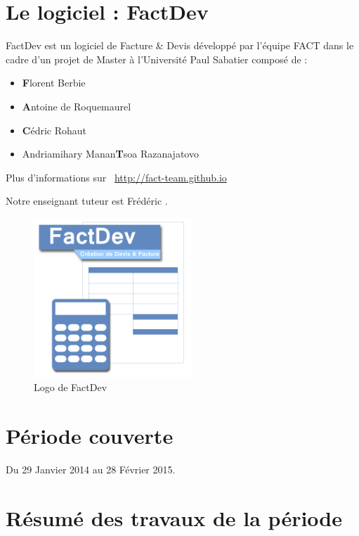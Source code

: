 \documentclass[12pt,a4paper,openany]{article}
\begin{document}
	\thispagestyle{empty} %
	\titleBC 
	\newpage
	\setcounter{tocdepth}{1}
	\setcounter{secnumdepth}{3}
	
	\tableofcontents
	\newpage
	\section{Le logiciel : FactDev}
	FactDev est un logiciel de Facture \& Devis développé par l'équipe FACT dans le cadre d'un projet de Master à l'Université Paul Sabatier composé de : 
	\begin{itemize}
		\item \textbf{F}lorent Berbie
		\item \textbf{A}ntoine de Roquemaurel
		\item \textbf{C}édric Rohaut
		\item Andriamihary Manan\textbf{T}soa Razanajatovo
	\end{itemize}

	Plus d’informations sur \Mundus~\url{http://fact-team.github.io}

	Notre enseignant tuteur est Frédéric .

	\begin{figure}[H]
		\centering
		\includegraphics[width=6cm]{../FACTDev.png}
		\caption{Logo de FactDev}
	\end{figure}

	\section{Période couverte}
	Du 29 Janvier 2014 au 28 Février 2015.

	\section{Résumé des travaux de la période}
\end{document}
